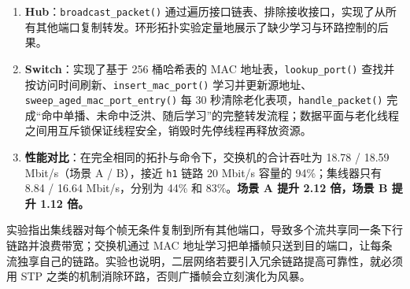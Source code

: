 \documentclass[UTF8,12pt,a4paper,fontset=fandol]{ctexart}
\begin{document}
\begin{enumerate}[leftmargin=1.9em]
  \item \textbf{Hub}：\texttt{broadcast_packet()} 通过遍历接口链表、排除接收接口，实现了从所有其他端口复制转发。环形拓扑实验定量地展示了缺少学习与环路控制的后果。
  \item \textbf{Switch}：实现了基于 256 桶哈希表的 MAC 地址表，\texttt{lookup_port()} 查找并按访问时间刷新、\texttt{insert_mac_port()} 学习并更新源地址、\texttt{sweep_aged_mac_port_entry()} 每 30 秒清除老化表项，\texttt{handle_packet()} 完成“命中单播、未命中泛洪、随后学习”的完整转发流程；数据平面与老化线程之间用互斥锁保证线程安全，销毁时先停线程再释放资源。
  \item \textbf{性能对比}：在完全相同的拓扑与命令下，交换机的合计吞吐为 18.78 / 18.59 Mbit/s（场景 A / B），接近 \texttt{h1} 链路 20 Mbit/s 容量的 94\%；集线器只有 8.84 / 16.64 Mbit/s，分别为 44\% 和 83\%。\textbf{场景 A 提升 2.12 倍，场景 B 提升 1.12 倍。}
\end{enumerate}

实验指出集线器对每个帧无条件复制到所有其他端口，导致多个流共享同一条下行链路并浪费带宽；交换机通过 MAC 地址学习把单播帧只送到目的端口，让每条流独享自己的链路。实验也说明，二层网络若要引入冗余链路提高可靠性，就必须用 STP 之类的机制消除环路，否则广播帧会立刻演化为风暴。
\end{document}
